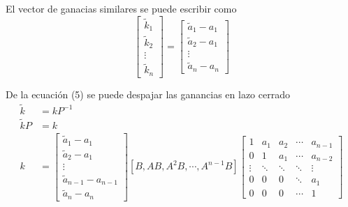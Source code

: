 El vector de ganacias similares se puede escribir como
\[
    \begin{bmatrix}
        \tilde{k}_{1} \\ \tilde{k}_{2} \\ \vdots \\ \tilde{k}_{n}
    \end{bmatrix}
    =
    \begin{bmatrix}
        \tilde{a}_1 - a_{1} \\
        \tilde{a}_{2} -a_{1} \\
        \vdots \\
        \tilde{a}_n -a_{n}
    \end{bmatrix}
\]

De la ecuación (5) se puede despajar las ganancias en lazo cerrado
\[
    \begin{split}
        \tilde{k} & = kP^{-1} \\
        \tilde{k}P & = k \\
        k & =
        \begin{bmatrix}
            \tilde{a}_1 - a_{1} \\
            \tilde{a}_{2} -a_{1} \\
            \vdots \\
            \tilde{a}_{n-1} -a_{n-1}\\
            \tilde{a}_{n} -a_{n}
        \end{bmatrix}
        [B, AB, A^{2}B, \cdots, A^{n-1}B ]
        \begin{bmatrix}
            1 & a_{1} & a_{2} & \cdots & a_{n-1} \\
            0 & 1 & a_{1} & \cdots & a_{n-2}\\
            \vdots & \ddots & \ddots & \ddots & \vdots\\
            0 & 0 & 0 & \ddots & a_{1}\\
            0 & 0 & 0 & \cdots & 1
        \end{bmatrix}
    \end{split}
\]